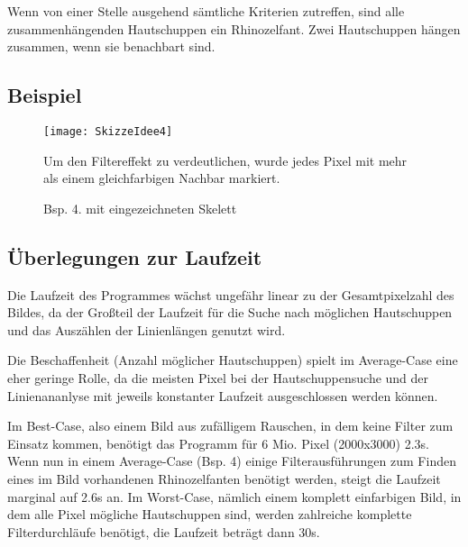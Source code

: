 Wenn von einer Stelle ausgehend sämtliche Kriterien zutreffen, sind alle zusammenhängenden Hautschuppen ein Rhinozelfant. Zwei Hautschuppen hängen zusammen, wenn sie benachbart sind.

\clearpage
\subsection{Beispiel}
\begin{figure}[!ht]
	\centering
	\texttt{[image: SkizzeIdee4]}
	\caption {Bsp. 4. mit eingezeichneten Skelett}
	Um den Filtereffekt zu verdeutlichen, wurde jedes Pixel mit mehr als einem gleichfarbigen Nachbar markiert.
\end{figure}
\clearpage

\subsection {Überlegungen zur Laufzeit}
Die Laufzeit des Programmes wächst ungefähr linear zu der Gesamtpixelzahl des Bildes, da der Großteil der Laufzeit für die Suche nach möglichen Hautschuppen und das Auszählen der Linienlängen genutzt wird.

Die Beschaffenheit (Anzahl möglicher Hautschuppen) spielt im Average-Case eine eher geringe Rolle, da die meisten Pixel bei der Hautschuppensuche und der Linienananlyse mit jeweils konstanter Laufzeit ausgeschlossen werden können.

Im Best-Case, also einem Bild aus zufälligem Rauschen, in dem keine Filter zum Einsatz kommen, benötigt das Programm für 6 Mio. Pixel (2000x3000) 2.3s. 
Wenn nun in einem Average-Case (Bsp. 4) einige Filterausführungen zum Finden eines im Bild vorhandenen Rhinozelfanten benötigt werden, steigt die Laufzeit marginal auf 2.6s an. 
Im Worst-Case, nämlich einem komplett einfarbigen Bild, in dem alle Pixel mögliche Hautschuppen sind, werden zahlreiche komplette Filterdurchläufe benötigt, die Laufzeit beträgt dann 30s.

